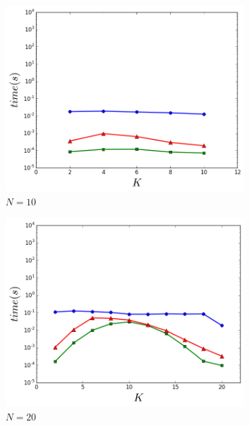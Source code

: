 \begin{figure}[t] 
  \begin{subfigure}[b]{0.3\linewidth}
    \centering
    \includegraphics[width=0.9\linewidth]{Pictures/n10} 
    \caption{$N=10$} 
    \label{fig:fixed_n:a} 
  \end{subfigure}%
  \begin{subfigure}[b]{0.3\linewidth}
    \centering
    \includegraphics[width=0.9\linewidth]{Pictures/n20} 
    \caption{$N=20$} 
    \label{fig:fixed_n:b} 
  \end{subfigure} 
  \begin{subfigure}[b]{0.3\linewidth}
    \centering

\end{subfigure}
\end{figure}
